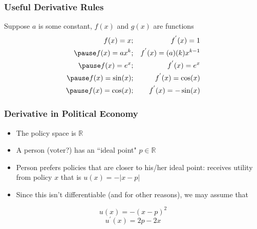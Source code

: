\documentclass{beamer}
\numberwithin{equation}{section}
\begin{document}
\begin{frame}
\frametitle{Useful Derivative Rules}

Suppose $a$ is some constant, $f(x)$ and $g(x)$ are functions \pause 
\begin{eqnarray}
f(x) = x & ; & f^{'}(x) = 1 \nonumber \\ \pause 
f(x) = a x^{k} & ; & f^{'}(x) = (a) (k) x ^{k-1} \nonumber \\ \pause 
f(x) = e^{x } & ; & f^{'} (x) = e^{x} \nonumber \\ \pause 
f(x) = \sin(x) & ; & f^{'} (x) = \cos (x) \nonumber \\ \pause 
f(x) = \cos(x) & ; & f^{'} (x) = - \sin(x) \nonumber 
\end{eqnarray}

\end{frame}



\begin{frame}
\frametitle{Derivative in Political Economy}

\begin{itemize}
\item The policy space is $\mathbb{R}$ \pause
\item A person (voter?)  has an ``ideal point" $p\in \mathbb{R}$ \pause
\item Person prefers policies that are closer to his/her ideal point: receives utility  from policy $x$ that is $u(x)=-|x-p|$ \pause
\item Since this isn't differentiable (and for other reasons), we may assume that 
\end{itemize}
$$u(x)=-(x-p)^2$$
$$u^\prime(x)=2p-2x$$

\end{frame}
\end{document}
